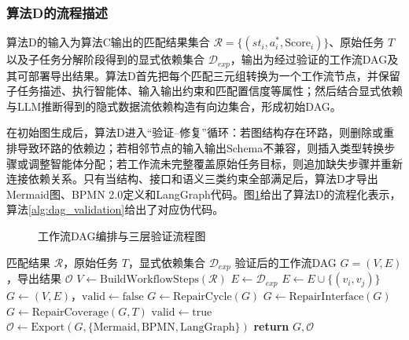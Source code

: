 \subsubsection{算法D的流程描述}

算法D的输入为算法C输出的匹配结果集合 $\mathcal{R}=\{(st_i,a_i^*,\text{Score}_i)\}$、原始任务 $T$ 以及子任务分解阶段得到的显式依赖集合 $\mathcal{D}_{exp}$，输出为经过验证的工作流DAG及其可部署导出结果。算法D首先把每个匹配三元组转换为一个工作流节点，并保留子任务描述、执行智能体、输入输出约束和匹配置信度等属性；然后结合显式依赖与LLM推断得到的隐式数据流依赖构造有向边集合，形成初始DAG。

在初始图生成后，算法D进入“验证--修复”循环：若图结构存在环路，则删除或重排导致环路的依赖边；若相邻节点的输入输出Schema不兼容，则插入类型转换步骤或调整智能体分配；若工作流未完整覆盖原始任务目标，则追加缺失步骤并重新连接依赖关系。只有当结构、接口和语义三类约束全部满足后，算法D才导出Mermaid图、BPMN 2.0定义和LangGraph代码。图\ref{fig:algorithm_d_flow}给出了算法D的流程化表示，算法\ref{alg:dag_validation}给出了对应伪代码。

\begin{figure}[H]
\centering

\caption{工作流DAG编排与三层验证流程图}
\label{fig:algorithm_d_flow}
\end{figure}

\begin{algorithm}[H]
\caption{工作流DAG编排与三层验证算法（算法D）}
\label{alg:dag_validation}
\begin{algorithmic}[1]
\Require 匹配结果 $\mathcal{R}$，原始任务 $T$，显式依赖集合 $\mathcal{D}_{exp}$
\Ensure 验证后的工作流DAG $G=(V,E)$，导出结果 $\mathcal{O}$
\State $V \gets \mathrm{BuildWorkflowSteps}(\mathcal{R})$
\State $E \gets \mathcal{D}_{exp}$
        \State $E \gets E \cup \{(v_i, v_j)\}$
    \EndIf
\EndFor
\State $G \gets (V,E)$，$\mathrm{valid} \gets \mathrm{false}$
        \State $G \gets \mathrm{RepairCycle}(G)$
        \State $G \gets \mathrm{RepairInterface}(G)$
        \State $G \gets \mathrm{RepairCoverage}(G,T)$
    \Else
        \State $\mathrm{valid} \gets \mathrm{true}$
    \EndIf
\EndWhile
\State $\mathcal{O} \gets \mathrm{Export}(G,\{\mathrm{Mermaid}, \mathrm{BPMN}, \mathrm{LangGraph}\})$
\State \textbf{return} $G,\mathcal{O}$
\end{algorithmic}
\end{algorithm}

